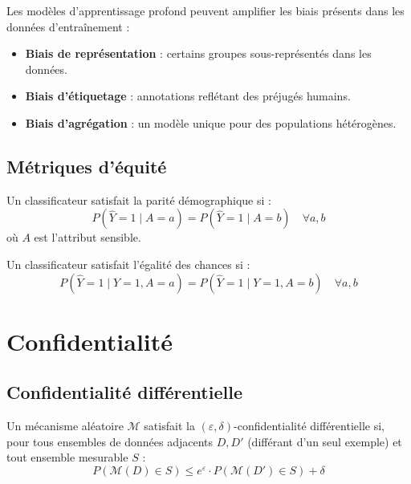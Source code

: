\begin{attention}
Les mod\`eles d'apprentissage profond peuvent amplifier les biais pr\'esents dans les donn\'ees d'entra\^inement :
\begin{itemize}
\item \textbf{Biais de repr\'esentation} : certains groupes sous-repr\'esent\'es dans les donn\'ees.
\item \textbf{Biais d'\'etiquetage} : annotations refl\'etant des pr\'ejug\'es humains.
\item \textbf{Biais d'agr\'egation} : un mod\`ele unique pour des populations h\'et\'erog\`enes.
\end{itemize}
\end{attention}

\subsection{M\'etriques d'\'equit\'e}

\begin{definition}
Un classificateur satisfait la parit\'e d\'emographique si :
\[
P(\hat{Y} = 1 \mid A = a) = P(\hat{Y} = 1 \mid A = b) \quad \forall a, b
\]
o\`u $A$ est l'attribut sensible.
\end{definition}

\begin{definition}
Un classificateur satisfait l'\'egalit\'e des chances si :
\[
P(\hat{Y} = 1 \mid Y = 1, A = a) = P(\hat{Y} = 1 \mid Y = 1, A = b) \quad \forall a, b
\]
\end{definition}

\section{Confidentialit\'e}
\label{sec:privacy}

\subsection{Confidentialit\'e diff\'erentielle}

\begin{definition}
Un m\'ecanisme al\'eatoire $\mathcal{M}$ satisfait la $(\varepsilon,\delta)$-confidentialit\'e diff\'erentielle si, pour tous ensembles de donn\'ees adjacents $D, D'$ (diff\'erant d'un seul exemple) et tout ensemble mesurable $S$ :
\[
P(\mathcal{M}(D) \in S) \leq e^\varepsilon \cdot P(\mathcal{M}(D') \in S) + \delta
\]
\end{definition}


